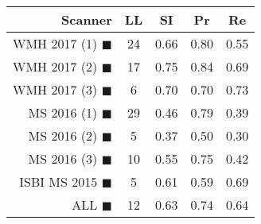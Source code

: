 \begin{tabular}{rcccc}
\toprule
Scanner & LL & SI & Pr & Re \\
\midrule
WMH 2017 (1) {\color[rgb]{ 1.00 0.00 0.00}$\blacksquare$} & 24 & 0.66 & 0.80 & 0.55 \\
WMH 2017 (2) {\color[rgb]{ 1.00 0.50 0.00}$\blacksquare$} & 17 & 0.75 & 0.84 & 0.69 \\
WMH 2017 (3) {\color[rgb]{ 1.00 0.80 0.00}$\blacksquare$} & 6 & 0.70 & 0.70 & 0.73 \\
MS  2016 (1) {\color[rgb]{ 0.20 0.80 0.00}$\blacksquare$} & 29 & 0.46 & 0.79 & 0.39 \\
MS  2016 (2) {\color[rgb]{ 0.00 0.40 1.00}$\blacksquare$} & 5 & 0.37 & 0.50 & 0.30 \\
MS  2016 (3) {\color[rgb]{ 0.60 0.00 1.00}$\blacksquare$} & 10 & 0.55 & 0.75 & 0.42 \\
ISBI MS 2015 {\color[rgb]{ 1.00 0.00 1.00}$\blacksquare$} & 5 & 0.61 & 0.59 & 0.69 \\
\midrule
ALL {\color[rgb]{ 1.00 1.00 1.00}$\blacksquare$} & 12 & 0.63 & 0.74 & 0.64 \\
\bottomrule
\end{tabular}